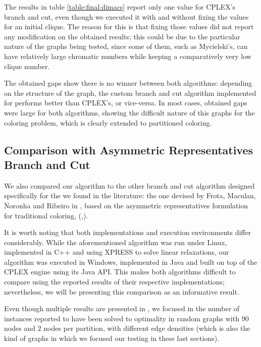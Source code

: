 The results in table \ref{table:final:dimacs} report only one value for \textsc{CPLEX}'s branch and cut, even though we executed it with and without fixing the values for an initial clique. The reason for this is that fixing those values did not report any modification on the obtained results; this could be due to the particular nature of the graphs being tested, since some of them, such as Mycielski's, can have relatively large chromatic numbers while keeping a comparatively very low clique number.

The obtained gaps show there is no winner between both algorithms: depending on the structure of the graph, the custom branch and cut algorithm implemented for \PCP{} performs better than \textsc{CPLEX}'s, or vice-versa. In most cases, obtained gaps were large for both algorithms, showing the difficult nature of this graphs for the coloring problem, which is clearly extended to partitioned coloring.
 
\subsection{Comparison with Asymmetric Representatives Branch and Cut}

We also compared our algorithm to the other branch and cut algorithm designed specifically for the \PCP{} we found in the literature: the one devised by Frota, Maculan, Noronha and Ribeiro in \cite{frota2010branch}, based on the asymmetric representatives formulation for traditional coloring, (\cite{campelo2004cliques},\cite{campelo2008asymmetric}).

It is worth noting that both implementations and execution environments differ considerably. While the aforementioned algorithm was run under Linux, implemented in C++ and  using \textsc{XPRESS} to solve linear relaxations, our algorithm was executed in Windows, implemented in Java and built on top of the \textsc{CPLEX} engine using its Java API. This makes both algorithms difficult to compare using the reported results of their respective implementations; nevertheless, we will be presenting this comparison as an informative result.

Even though multiple results are presented in \cite{frota2010branch}, we focused in the number of instances reported to have been solved to optimality in random graphs with $90$ nodes and $2$ nodes per partition, with different edge densities (which is also the kind of graphs in which we focused our testing in these last sections). 

